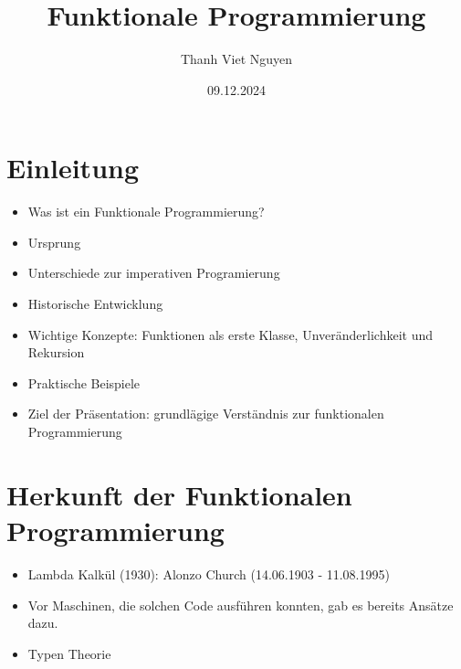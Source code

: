 \documentclass{beamer}
\title{Funktionale Programmierung}
\author{Thanh Viet Nguyen}
\begin{document}
\begin{frame}%
    \maketitle
    \centering
   \date{09.12.2024}

\end{frame}

\begin{frame}
	\tableofcontents
\end{frame}


\section{Einleitung}
\begin{frame}
\begin{itemize}
\item Was ist ein Funktionale Programmierung?
\item Ursprung
\item Unterschiede zur imperativen Programierung
\item Historische Entwicklung
\item Wichtige Konzepte: Funktionen als erste Klasse, Unveränderlichkeit und Rekursion
\item Praktische Beispiele
\item Ziel der Präsentation: grundlägige Verständnis  zur funktionalen Programmierung
\end{itemize}
\end{frame}

\section{Herkunft der Funktionalen Programmierung}
\begin{frame}
	\begin{itemize}
		\item Lambda Kalkül (1930): Alonzo Church (14.06.1903 - 11.08.1995)
		\item Vor Maschinen, die solchen Code ausführen konnten, gab es bereits Ansätze dazu.
            \item Typen Theorie
	\end{itemize}
\end{frame}
\end{document}
